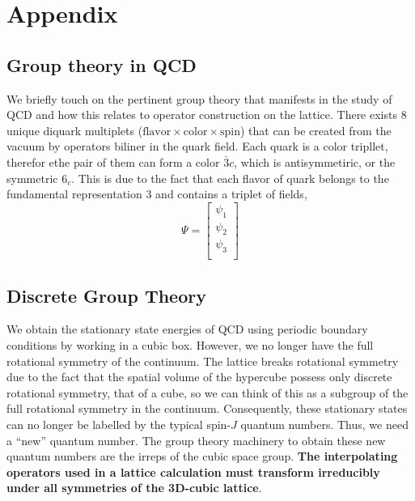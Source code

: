\chapter{Appendix}
\label{sec:app}
\section{Group theory in QCD}
We briefly touch on the pertinent group theory that manifests in the study of QCD and how this relates to operator construction on the lattice. 
There exists 8 unique diquark multiplets ($\text{flavor} \times \text{color} \times \text{spin}$) that can be created from the vacuum by operators biliner in the quark field. Each quark is a color tripllet, therefor ethe pair of them can form a color $\bar{3}c$, which is antisymmetiric, or the symmetric $6_c$. This is due to the fact that each flavor of quark belongs to the fundamental representation $3$ and contains a triplet of fields, 
\begin{equation}
    \Psi = \begin{bmatrix}
        \psi_1 \\
        \psi_2 \\
        \psi_3 \\ 
    \end{bmatrix}
\end{equation}

\section{Discrete Group Theory}

We obtain the stationary state energies of QCD using periodic boundary conditions by working in a cubic box. However, we no longer have the full rotational symmetry of the continuum. The lattice breaks rotational symmetry due to the fact that the spatial volume of the hypercube possess only discrete rotational symmetry, that of a cube, so we can think of this as a subgroup of the full rotational symmetry in the continuum. Consequently, these stationary states can no longer be labelled by the typical spin-$J$ quantum numbers. Thus, we need a ``new'' quantum number. The group theory machinery to obtain these new quantum numbers are the irreps of the cubic space group. \textbf{The interpolating operators used in a lattice calculation must transform irreducibly under all symmetries of the 3D-cubic lattice}. 

